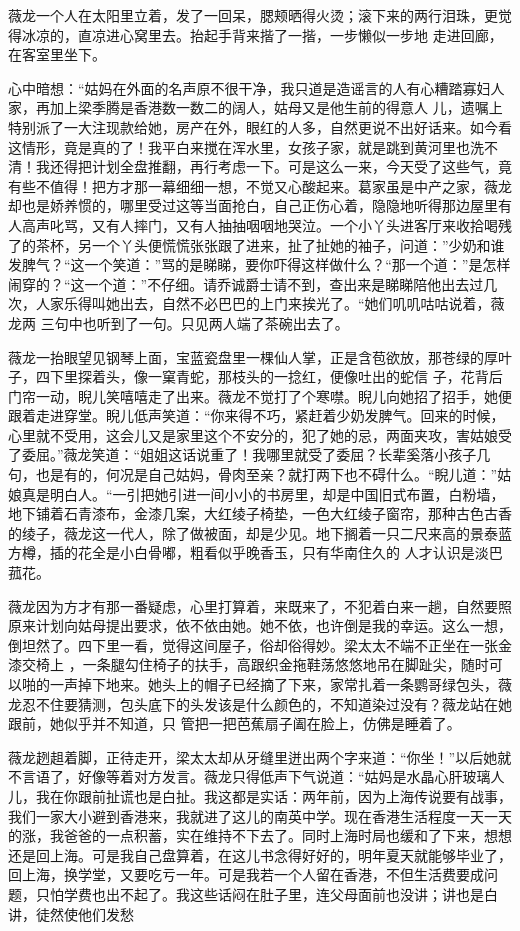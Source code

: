 \documentclass{article}
\begin{document}
薇龙一个人在太阳里立着，发了一回呆，腮颊晒得火烫；滚下来的两行泪珠，更觉得冰凉的，直凉进心窝里去。抬起手背来揩了一揩，一步懒似一步地
走进回廊，在客室里坐下。 

心中暗想：“姑妈在外面的名声原不很干净，我只道是造谣言的人有心糟踏寡妇人家，再加上梁季腾是香港数一数二的阔人，姑母又是他生前的得意人
\newpage
儿，遗嘱上特别派了一大注现款给她，房产在外，眼红的人多，自然更说不出好话来。如今看这情形，竟是真的了！我平白来搅在浑水里，女孩子家，就是跳到黄河里也洗不清！我还得把计划全盘推翻，再行考虑一下。可是这么一来，今天受了这些气，竟有些不值得！把方才那一幕细细一想，不觉又心酸起来。葛家虽是中产之家，薇龙却也是娇养惯的，哪里受过这等当面抢白，自己正伤心着，隐隐地听得那边屋里有人高声叱骂，又有人摔门，又有人抽抽咽咽地哭泣。一个小丫头进客厅来收拾喝残了的茶杯，另一个丫头便慌慌张张跟了进来，扯了扯她的袖子，问道：”少奶和谁发脾气？“这一个笑道：”骂的是睇睇，要你吓得这样做什么？“那一个道：”是怎样闹穿的？“这一个道：”不仔细。请乔诚爵士请不到，查出来是睇睇陪他出去过几次，人家乐得叫她出去，自然不必巴巴的上门来挨光了。“她们叽叽咕咕说着，薇龙两
三句中也听到了一句。只见两人端了茶碗出去了。 

薇龙一抬眼望见钢琴上面，宝蓝瓷盘里一棵仙人掌，正是含苞欲放，那苍绿的厚叶子，四下里探着头，像一窠青蛇，那枝头的一捻红，便像吐出的蛇信
\newpage
子，花背后门帘一动，睨儿笑嘻嘻走了出来。薇龙不觉打了个寒噤。睨儿向她招了招手，她便跟着走进穿堂。睨儿低声笑道：“你来得不巧，紧赶着少奶发脾气。回来的时候，心里就不受用，这会儿又是家里这个不安分的，犯了她的忌，两面夹攻，害姑娘受了委屈。”薇龙笑道：“姐姐这话说重了！我哪里就受了委屈？长辈奚落小孩子几句，也是有的，何况是自己姑妈，骨肉至亲？就打两下也不碍什么。“睨儿道：”姑娘真是明白人。“一引把她引进一间小小的书房里，却是中国旧式布置，白粉墙，地下铺着石青漆布，金漆几案，大红绫子椅垫，一色大红绫子窗帘，那种古色古香的绫子，薇龙这一代人，除了做被面，却是少见。地下搁着一只二尺来高的景泰蓝方樽，插的花全是小白骨嘟，粗看似乎晚香玉，只有华南住久的
人才认识是淡巴菰花。 

薇龙因为方才有那一番疑虑，心里打算着，来既来了，不犯着白来一趟，自然要照原来计划向姑母提出要求，依不依由她。她不依，也许倒是我的幸运。这么一想，倒坦然了。四下里一看，觉得这间屋子，俗却俗得妙。梁太太不端不正坐在一张金漆交椅上
\newpage
，一条腿勾住椅子的扶手，高跟织金拖鞋荡悠悠地吊在脚趾尖，随时可以啪的一声掉下地来。她头上的帽子已经摘了下来，家常扎着一条鹦哥绿包头，薇龙忍不住要猜测，包头底下的头发该是什么颜色的，不知道染过没有？薇龙站在她跟前，她似乎并不知道，只
管把一把芭蕉扇子阖在脸上，仿佛是睡着了。 

薇龙趔趄着脚，正待走开，梁太太却从牙缝里迸出两个字来道：“你坐！”以后她就不言语了，好像等着对方发言。薇龙只得低声下气说道：“姑妈是水晶心肝玻璃人儿，我在你跟前扯谎也是白扯。我这都是实话：两年前，因为上海传说要有战事，我们一家大小避到香港来，我就进了这儿的南英中学。现在香港生活程度一天一天的涨，我爸爸的一点积蓄，实在维持不下去了。同时上海时局也缓和了下来，想想还是回上海。可是我自己盘算着，在这儿书念得好好的，明年夏天就能够毕业了，回上海，换学堂，又要吃亏一年。可是我若一个人留在香港，不但生活费要成问题，只怕学费也出不起了。我这些话闷在肚子里，连父母面前也没讲；讲也是白讲，徒然使他们发愁
\end{document}
